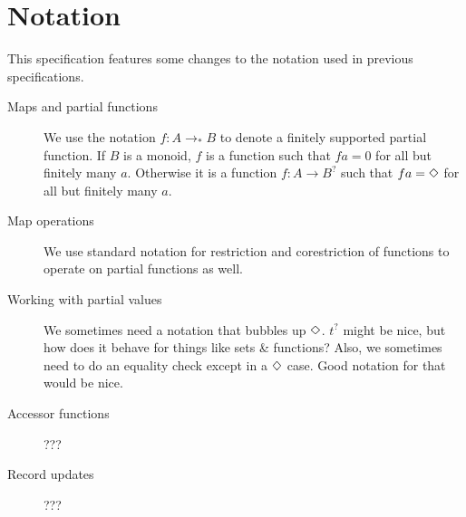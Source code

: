 \newcommand{\pto}{\to_{*}}

\section{Notation}

This specification features some changes to the notation used in previous specifications.

\begin{description}
\item[Maps and partial functions] We use the notation $f : A \pto B$
  to denote a finitely supported partial function. If $B$ is a monoid,
  $f$ is a function such that $f a = 0$ for all but finitely many
  $a$. Otherwise it is a function $f : A \to B^?$ such that
  $f a = \Diamond$ for all but finitely many $a$.
\item[Map operations] We use standard notation for restriction and
  corestriction of functions to operate on partial functions as well.
\item[Working with partial values] We sometimes need a notation that
  bubbles up $\Diamond$. $t^?$ might be nice, but how does it behave
  for things like sets \& functions? Also, we sometimes need to do an
  equality check except in a $\Diamond$ case. Good notation for that
  would be nice.
\item[Accessor functions] ???
\item[Record updates] ???
\end{description}

